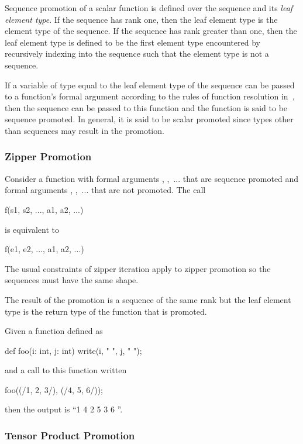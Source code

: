 Sequence promotion of a scalar function is defined over the sequence
and its {\em leaf element type}.  If the sequence has rank one, then
the leaf element type is the element type of the sequence.  If the
sequence has rank greater than one, then the leaf element type is
defined to be the first element type encountered by recursively
indexing into the sequence such that the element type is not a
sequence.

If a variable of type equal to the leaf element type of the sequence
can be passed to a function's formal argument according to the rules
of function resolution in~, then the
sequence can be passed to this function and the function is said to be
sequence promoted.  In general, it is said to be scalar promoted since
types other than sequences may result in the promotion.

\subsubsection{Zipper Promotion}
\label{Zipper_Promotion}

Consider a function  with formal
arguments , ,~... that are sequence promoted and
formal arguments , ,~... that are not promoted.  The
call
\begin{chapel}
f(s1, s2, ..., a1, a2, ...)
\end{chapel}
is equivalent to
\begin{chapel}
[(e1, e2, ...) in (s1, s2, ...)] f(e1, e2, ..., a1, a2, ...)
\end{chapel}
The usual constraints of zipper iteration apply to zipper promotion so
the sequences must have the same shape.

The result of the promotion is a sequence of the same rank but the
leaf element type is the return type of the function that is promoted.

\begin{example}
Given a function defined as
\begin{chapel}
def foo(i: int, j: int) {
  write(i, " ", j, " ");
}
\end{chapel}
and a call to this function written
\begin{chapel}
foo((/1, 2, 3/), (/4, 5, 6/));
\end{chapel}
then the output is ``1 4 2 5 3 6 ''.
\end{example}

\subsubsection{Tensor Product Promotion}
\label{Tensor_Product_Promotion}

